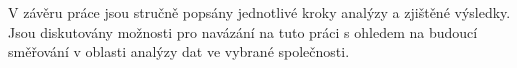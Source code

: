 V závěru práce jsou stručně popsány jednotlivé kroky analýzy a zjištěné výsledky. Jsou diskutovány možnosti pro navázání na tuto práci s ohledem na budoucí směřování v oblasti analýzy dat ve vybrané společnosti.




